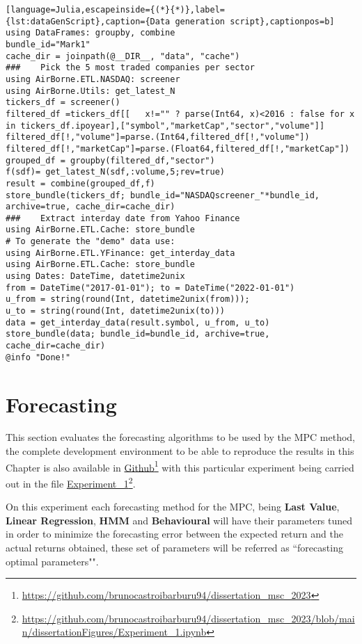 \begin{lstlisting}[language=Julia,escapeinside={(*}{*)},label={lst:dataGenScript},caption={Data generation script},captionpos=b]
using DataFrames: groupby, combine
bundle_id="Mark1"
cache_dir = joinpath(@__DIR__, "data", "cache")
###    Pick the 5 most traded companies per sector
using AirBorne.ETL.NASDAQ: screener
using AirBorne.Utils: get_latest_N
tickers_df = screener()
filtered_df =tickers_df[[   x!="" ? parse(Int64, x)<2016 : false for x in tickers_df.ipoyear],["symbol","marketCap","sector","volume"]]
filtered_df[!,"volume"]=parse.(Int64,filtered_df[!,"volume"])
filtered_df[!,"marketCap"]=parse.(Float64,filtered_df[!,"marketCap"])
grouped_df = groupby(filtered_df,"sector")
f(sdf)= get_latest_N(sdf,:volume,5;rev=true)
result = combine(grouped_df,f)
store_bundle(tickers_df; bundle_id="NASDAQscreener_"*bundle_id, archive=true, cache_dir=cache_dir)
###    Extract interday date from Yahoo Finance   
using AirBorne.ETL.Cache: store_bundle
# To generate the "demo" data use:
using AirBorne.ETL.YFinance: get_interday_data
using AirBorne.ETL.Cache: store_bundle
using Dates: DateTime, datetime2unix
from = DateTime("2017-01-01"); to = DateTime("2022-01-01")
u_from = string(round(Int, datetime2unix(from)));
u_to = string(round(Int, datetime2unix(to)))
data = get_interday_data(result.symbol, u_from, u_to)
store_bundle(data; bundle_id=bundle_id, archive=true, cache_dir=cache_dir)
@info "Done!"

\end{lstlisting}

\section{Forecasting} \label{sec:ch5_forecast}
This section evaluates the forecasting algorithms to be used by the \ac{MPC} method, the complete development environment to be able to reproduce the results in this Chapter is also available in \href{https://github.com/brunocastroibarburu94/dissertation_msc_2023}{Github}\footnote{\url{https://github.com/brunocastroibarburu94/dissertation_msc_2023}} with this particular experiment being carried out in the file \href{https://github.com/brunocastroibarburu94/dissertation_msc_2023/blob/main/dissertationFigures/Experiment_1.ipynb}{Experiment\_1}\footnote{\url{https://github.com/brunocastroibarburu94/dissertation_msc_2023/blob/main/dissertationFigures/Experiment_1.ipynb}}.


On this experiment each forecasting method for the MPC, being \textbf{Last Value}, \textbf{Linear Regression}, \textbf{\ac{HMM}} and \textbf{Behavioural} will have their parameters tuned in order to minimize the forecasting error between the expected return and the actual returns obtained, these set of parameters will be referred as ``forecasting optimal parameters"".

